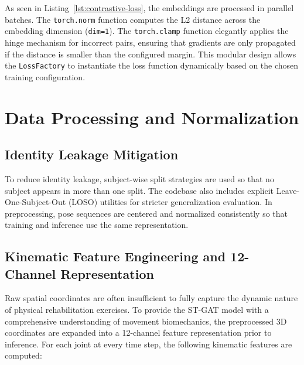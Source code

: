 As seen in Listing~\ref{lst:contrastive-loss}, the embeddings are processed in parallel batches. The \texttt{torch.norm} function computes the L2 distance across the embedding dimension (\texttt{dim=1}). The \texttt{torch.clamp} function elegantly applies the hinge mechanism for incorrect pairs, ensuring that gradients are only propagated if the distance is smaller than the configured margin. This modular design allows the \texttt{LossFactory} to instantiate the loss function dynamically based on the chosen training configuration.

\section{Data Processing and Normalization}

\subsection{Identity Leakage Mitigation}
To reduce identity leakage, subject-wise split strategies are used so that no subject appears in more than one split. The codebase also includes explicit Leave-One-Subject-Out (LOSO) utilities for stricter generalization evaluation. In preprocessing, pose sequences are centered and normalized consistently so that training and inference use the same representation.

\subsection{Kinematic Feature Engineering and 12-Channel Representation}
Raw spatial coordinates are often insufficient to fully capture the dynamic nature of physical rehabilitation exercises. To provide the ST-GAT model with a comprehensive understanding of movement biomechanics, the preprocessed 3D coordinates are expanded into a 12-channel feature representation prior to inference. For each joint at every time step, the following kinematic features are computed:

